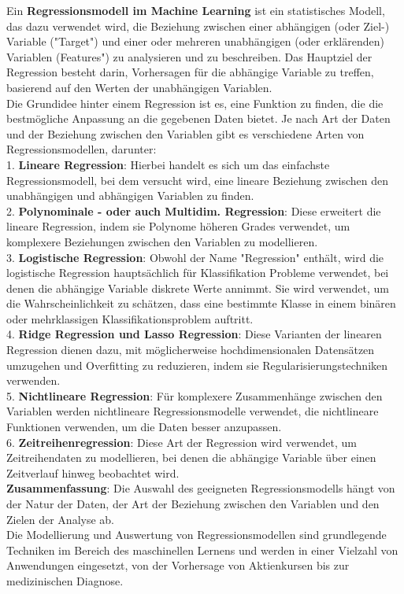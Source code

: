 \documentclass[12pt]{article}
\begin{document}
Ein \textbf{Regressionsmodell im Machine Learning} ist ein statistisches Modell, das dazu verwendet wird, die Beziehung zwischen einer abhängigen (oder Ziel-) Variable ("Target") und einer oder mehreren unabhängigen (oder erklärenden) Variablen (Features") zu analysieren und zu beschreiben. Das Hauptziel der Regression besteht darin, Vorhersagen für die abhängige Variable zu treffen, basierend auf den Werten der unabhängigen Variablen.\\
Die Grundidee hinter einem Regression ist es, eine Funktion zu finden, die die bestmögliche Anpassung an die gegebenen Daten bietet. Je nach Art der Daten und der Beziehung zwischen den Variablen gibt es verschiedene Arten von Regressionsmodellen, darunter:\\[0.2cm] 
% 
1. \textbf{Lineare Regression}: Hierbei handelt es sich um das einfachste Regressionsmodell, bei dem versucht wird, eine lineare Beziehung zwischen den unabhängigen und abhängigen Variablen zu finden.\\[0.2cm]
%  
2. \textbf{Polynominale - oder auch Multidim. Regression}: Diese erweitert die lineare Regression, indem sie Polynome höheren Grades verwendet, um komplexere Beziehungen zwischen den Variablen zu modellieren.\\[0.2cm]
% 
3. \textbf{Logistische Regression}: Obwohl der Name "Regression" enthält, wird die logistische Regression hauptsächlich für Klassifikation Probleme verwendet, bei denen die abhängige Variable diskrete Werte annimmt. Sie wird verwendet, um die Wahrscheinlichkeit zu schätzen, dass eine bestimmte Klasse in einem binären oder mehrklassigen Klassifikationsproblem auftritt.\\[0.2cm]
%  
4. \textbf{Ridge Regression und Lasso Regression}: Diese Varianten der linearen Regression dienen dazu, mit möglicherweise hochdimensionalen Datensätzen umzugehen und Overfitting zu reduzieren, indem sie Regularisierungstechniken verwenden.\\[0.2cm] 
% 
5. \textbf{Nichtlineare Regression}: Für komplexere Zusammenhänge zwischen den Variablen werden nichtlineare Regressionsmodelle verwendet, die nichtlineare Funktionen verwenden, um die Daten besser anzupassen.\\[0.2cm]
% 
6. \textbf{Zeitreihenregression}: Diese Art der Regression wird verwendet, um Zeitreihendaten zu modellieren, bei denen die abhängige Variable über einen Zeitverlauf hinweg beobachtet wird.\\[0.2cm]
% 
\textbf{Zusammenfassung}: Die Auswahl des geeigneten Regressionsmodells hängt von der Natur der Daten, der Art der Beziehung zwischen den Variablen und den Zielen der Analyse ab.\\Die Modellierung und Auswertung von Regressionsmodellen sind grundlegende Techniken im Bereich des maschinellen Lernens und werden in einer Vielzahl von Anwendungen eingesetzt, von der Vorhersage von Aktienkursen bis zur medizinischen Diagnose.\\[0.2cm] 
\end{document}
